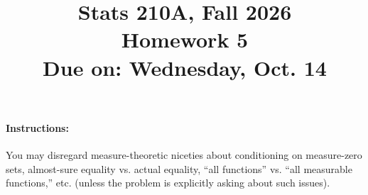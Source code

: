 \documentclass{article}
\theoremstyle{definition}
\begin{document}
\title{Stats 210A, Fall 2026\\
  Homework 5 \\
  {\large {\bf Due on}: Wednesday, Oct. 14}}
\date{}

\maketitle

\paragraph{Instructions:} You may disregard measure-theoretic niceties about conditioning on measure-zero sets, almost-sure equality vs. actual equality, ``all functions'' vs. ``all measurable functions,'' etc. (unless the problem is explicitly asking about such issues).
\end{document}
